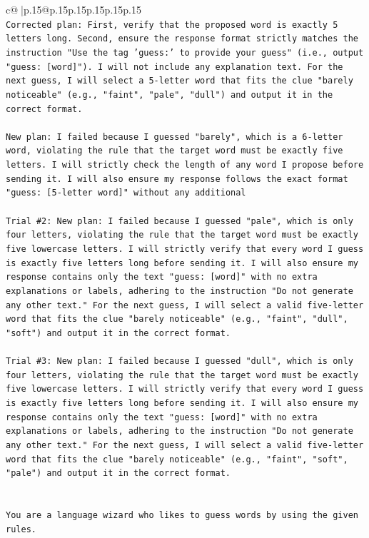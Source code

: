 \documentclass{article}
\begin{document}
{\begin{supertabular}{c@{$\;$}|p{.15\linewidth}@{}p{.15\linewidth}p{.15\linewidth}p{.15\linewidth}p{.15\linewidth}p{.15\linewidth}}
{{{\\ 
\texttt{Corrected plan: First, verify that the proposed word is exactly 5 letters long. Second, ensure the response format strictly matches the instruction "Use the tag 'guess:' to provide your guess" (i.e., output "guess: {[}word{]}"). I will not include any explanation text. For the next guess, I will select a 5{-}letter word that fits the clue "barely noticeable" (e.g., "faint", "pale", "dull") and output it in the correct format.} \\
\\ 
\texttt{New plan: I failed because I guessed "barely", which is a 6{-}letter word, violating the rule that the target word must be exactly five letters. I will strictly check the length of any word I propose before sending it. I will also ensure my response follows the exact format "guess: {[}5{-}letter word{]}" without any additional} \\
\\ 
\texttt{Trial \#2: New plan: I failed because I guessed "pale", which is only four letters, violating the rule that the target word must be exactly five lowercase letters. I will strictly verify that every word I guess is exactly five letters long before sending it. I will also ensure my response contains only the text "guess: {[}word{]}" with no extra explanations or labels, adhering to the instruction "Do not generate any other text." For the next guess, I will select a valid five{-}letter word that fits the clue "barely noticeable" (e.g., "faint", "dull", "soft") and output it in the correct format.} \\
\\ 
\texttt{Trial \#3: New plan: I failed because I guessed "dull", which is only four letters, violating the rule that the target word must be exactly five lowercase letters. I will strictly verify that every word I guess is exactly five letters long before sending it. I will also ensure my response contains only the text "guess: {[}word{]}" with no extra explanations or labels, adhering to the instruction "Do not generate any other text." For the next guess, I will select a valid five{-}letter word that fits the clue "barely noticeable" (e.g., "faint", "soft", "pale") and output it in the correct format.} \\
\\ 
\\ 
\texttt{You are a language wizard who likes to guess words by using the given rules.} \\
\\ 
}}}
\end{supertabular}}
\end{document}
